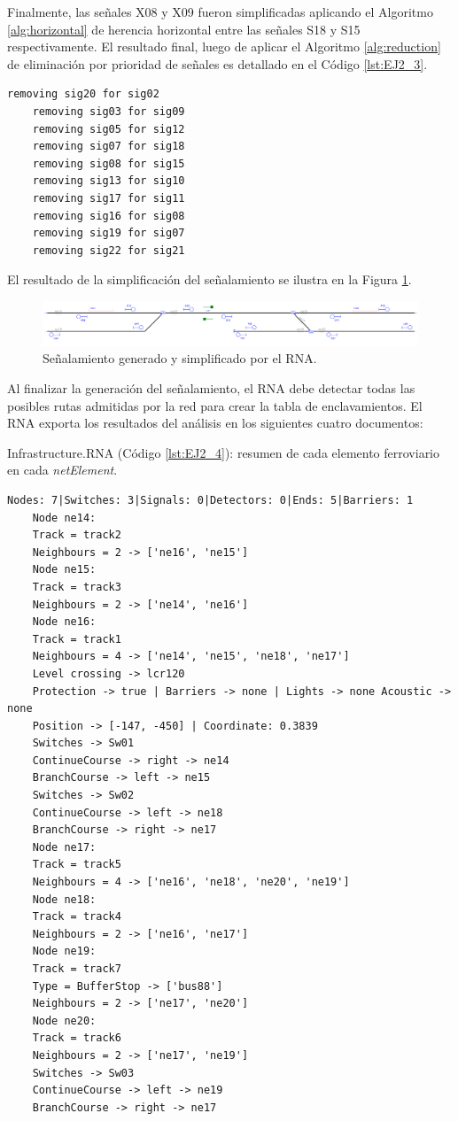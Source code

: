 	Finalmente, las señales X08 y X09 fueron simplificadas aplicando el Algoritmo \ref{alg:horizontal} de herencia horizontal entre las señales S18 y S15 respectivamente. El resultado final, luego de aplicar el Algoritmo \ref{alg:reduction} de eliminación por prioridad de señales es detallado en el Código \ref{lst:EJ2_3}.

	\begin{lstlisting}[language = {}, caption = Reducción de señalamiento por prioridad de señales, label = {lst:EJ2_3}]
	removing sig20 for sig02
	removing sig03 for sig09
	removing sig05 for sig12
	removing sig07 for sig18
	removing sig08 for sig15
	removing sig13 for sig10
	removing sig17 for sig11
	removing sig16 for sig08
	removing sig19 for sig07
	removing sig22 for sig21
	\end{lstlisting}

	El resultado de la simplificación del señalamiento se ilustra en la Figura \ref{fig:EJ2_7}.

	 \begin{figure}[H]
		\centering
		\includegraphics[width=1\textwidth]{resultados-obtenidos/ejemplo2/images/2_RNA.png}
		\centering\caption{Señalamiento generado y simplificado por el RNA.}
		\label{fig:EJ2_7}
	\end{figure}
	
	Al finalizar la generación del señalamiento, el RNA debe detectar todas las posibles rutas admitidas por la red para crear la tabla de enclavamientos. El RNA exporta los resultados del análisis en los siguientes cuatro documentos:
	
	Infrastructure.RNA (Código \ref{lst:EJ2_4}): resumen de cada elemento ferroviario en cada \textit{netElement}.

	\begin{lstlisting}[language = {}, caption = Infrastructure.RNA, label = {lst:EJ2_4}]
	Nodes: 7|Switches: 3|Signals: 0|Detectors: 0|Ends: 5|Barriers: 1
	Node ne14:
	Track = track2
	Neighbours = 2 -> ['ne16', 'ne15']
	Node ne15:
	Track = track3
	Neighbours = 2 -> ['ne14', 'ne16']
	Node ne16:
	Track = track1
	Neighbours = 4 -> ['ne14', 'ne15', 'ne18', 'ne17']
	Level crossing -> lcr120
	Protection -> true | Barriers -> none | Lights -> none Acoustic -> none
	Position -> [-147, -450] | Coordinate: 0.3839
	Switches -> Sw01
	ContinueCourse -> right -> ne14
	BranchCourse -> left -> ne15
	Switches -> Sw02
	ContinueCourse -> left -> ne18
	BranchCourse -> right -> ne17
	Node ne17:
	Track = track5
	Neighbours = 4 -> ['ne16', 'ne18', 'ne20', 'ne19']
	Node ne18:
	Track = track4
	Neighbours = 2 -> ['ne16', 'ne17']
	Node ne19:
	Track = track7
	Type = BufferStop -> ['bus88']
	Neighbours = 2 -> ['ne17', 'ne20']
	Node ne20:
	Track = track6
	Neighbours = 2 -> ['ne17', 'ne19']
	Switches -> Sw03
	ContinueCourse -> left -> ne19
	BranchCourse -> right -> ne17
	\end{lstlisting}

